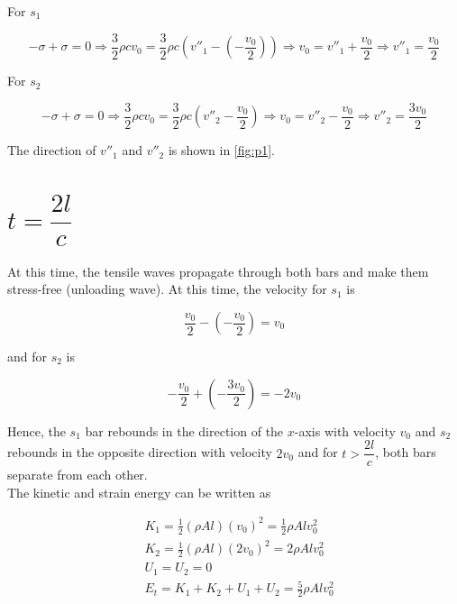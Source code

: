 \documentclass{article}
\begin{document}
For $s_1$

\begin{equation*}
    -\sigma + \sigma = 0 \Rightarrow \dfrac{3}{2} \rho c v_0 = \dfrac{3}{2} \rho c \left(v''_1 - \left(-\dfrac{v_0}{2} \right)\right) \Rightarrow v_0 = v''_1 + \dfrac{v_0}{2} \Rightarrow v''_1 = \dfrac{v_0}{2}
\end{equation*}

For $s_2$

\begin{equation*}
    -\sigma + \sigma = 0 \Rightarrow \dfrac{3}{2} \rho c v_0 = \dfrac{3}{2} \rho c \left(v''_2 - \dfrac{v_0}{2}\right) \Rightarrow v_0 = v''_2 - \dfrac{v_0}{2} \Rightarrow v''_2 = \dfrac{3v_0}{2}
\end{equation*}

The direction of  $v''_1$ and $v''_2$ is shown in \cref{fig:p1}.

\section{$t = \dfrac{2l}{c}$}
At this time, the tensile waves propagate through both bars and make them stress-free (unloading wave). At this time, the velocity for $s_1$ is

\begin{equation*}
    \frac{v_0}{2} - \left( -\frac{v_0}{2} \right) = v_0
\end{equation*}

and for $s_2$ is

\begin{equation*}
    -\frac{v_0}{2} + \left( -\frac{3v_0}{2} \right) = -2v_0
\end{equation*}

Hence, the $s_1$ bar rebounds in the direction of the $x$-axis with velocity $v_0$ and $s_2$ rebounds in the opposite direction with velocity $2v_0$ and for $t > \dfrac{2l}{c}$, both bars separate from each other. \\

The kinetic and strain energy can be written as 

\begin{align*}
    & K_1 = \frac{1}{2} (\rho A l) (v_0)^2 = \frac{1}{2} \rho A l v_0^2 \\
    & K_2 = \frac{1}{2} (\rho A l) (2v_0)^2 = 2 \rho A l v_0^2 \\
    & U_1 = U_2 = 0 \\
    & E_t = K_1 + K_2 + U_1 + U_2 = \frac{5}{2} \rho A l v_0^2
\end{align*}
\end{document}
